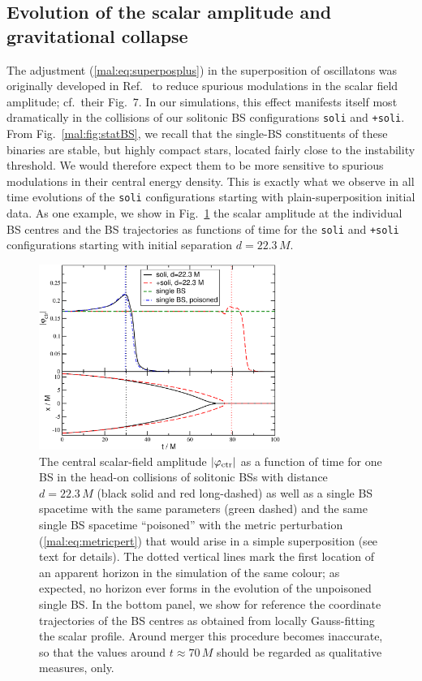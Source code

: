 \subsection{Evolution of the scalar amplitude and gravitational collapse}
%
The adjustment (\ref{mal:eq:superposplus}) in the superposition of oscillatons
was originally developed in Ref.~\cite{Helfer:2018vtq} to reduce
spurious modulations in the scalar field amplitude; cf.~their
Fig.~7. In our simulations, this effect manifests itself
most dramatically in the collisions of our solitonic BS
configurations {\tt soli} and {\tt +soli}.
From Fig.~\ref{mal:fig:statBS}, we recall that the single-BS constituents
of these binaries are stable, but highly compact stars, located
fairly close to the instability threshold. We would therefore expect
them to be more sensitive to spurious modulations in their central
energy density. This is exactly what we observe in all time evolutions
of the {\tt soli} configurations starting with plain-superposition
initial data. As one example, we show
in Fig.~\ref{mal:fig:soli_ampctr} the scalar amplitude
at the individual BS centres and the BS trajectories
as functions of time for the
{\tt soli} and {\tt +soli} configurations starting with initial
separation $d=22.3\,M$.
%
\begin{figure}
    \centering
    \includegraphics[width=0.7\textwidth]{malaise_source/ampctr_sBS.pdf}
    \caption{The central scalar-field amplitude $|\varphi_{\rm ctr}|$ 
    as a function of time for one BS in the head-on
    collisions of solitonic BSs with distance $d=22.3\,M$
    (black solid and red long-dashed) as well as a single
    BS spacetime with the same parameters (green dashed)
    and the same single BS spacetime ``poisoned'' with
    the metric perturbation (\ref{mal:eq:metricpert}) that would arise in a simple
    superposition (see text for details). The dotted
    vertical lines mark the first location of an
    apparent horizon in the simulation of the same colour;
    as expected, no horizon ever forms in the evolution
    of the unpoisoned single BS.
    In the bottom panel, we show for reference the coordinate
    trajectories of the BS centres as obtained from locally
    Gauss-fitting the scalar profile. Around merger this procedure
    becomes inaccurate, so that the values around $t\approx 70\,M$
    should be regarded as qualitative measures, only.
    }
    \label{mal:fig:soli_ampctr}
\end{figure}
